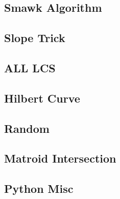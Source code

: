 \subsection{Smawk Algorithm}

\subsection{Slope Trick}

% 
% 
\subsection{ALL LCS}

\subsection{Hilbert Curve}

\subsection{Random}

% 
\subsection{Matroid Intersection}

\subsection{Python Misc}
